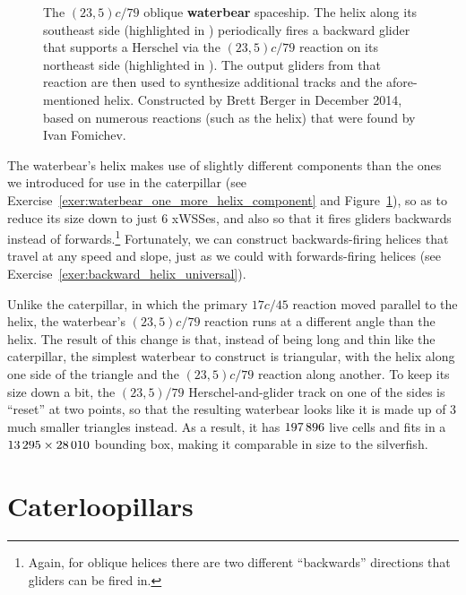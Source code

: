 \begin{figure}[!htb]
	\centering
	\caption{The $(23,5)c/79$ oblique \textbf{waterbear} spaceship. The helix along its southeast side (highlighted in ) periodically fires a backward glider that supports a Herschel via the $(23,5)c/79$ reaction on its northeast side (highlighted in ). The output gliders from that reaction are then used to synthesize additional tracks and the afore-mentioned helix. Constructed by Brett Berger in December 2014, based on numerous reactions (such as the helix) that were found by Ivan Fomichev.}\label{fig:waterbear}
\end{figure}

The waterbear's helix makes use of slightly different components than the ones we introduced for use in the caterpillar (see Exercise~\ref{exer:waterbear_one_more_helix_component} and Figure~\ref{fig:waterbear}), so as to reduce its size down to just $6$ xWSSes, and also so that it fires gliders backwards instead of forwards.\footnote{Again, for oblique helices there are two different ``backwards'' directions that gliders can be fired in.} Fortunately, we can construct backwards-firing helices that travel at any speed and slope, just as we could with forwards-firing helices (see Exercise~\ref{exer:backward_helix_universal}).

Unlike the caterpillar, in which the primary $17c/45$ reaction moved parallel to the helix, the waterbear's $(23,5)c/79$ reaction runs at a different angle than the helix. The result of this change is that, instead of being long and thin like the caterpillar, the simplest waterbear to construct is triangular, with the helix along one side of the triangle and the $(23,5)c/79$ reaction along another. To keep its size down a bit, the $(23,5)/79$ Herschel-and-glider track on one of the sides is ``reset'' at two points, so that the resulting waterbear looks like it is made up of $3$ much smaller triangles instead. As a result, it has $197{\,}896$ live cells and fits in a $13{\,}295 \times 28{\,}010$ bounding box, making it comparable in size to the silverfish.



\section{Caterloopillars}\label{sec:caterloopillar}

